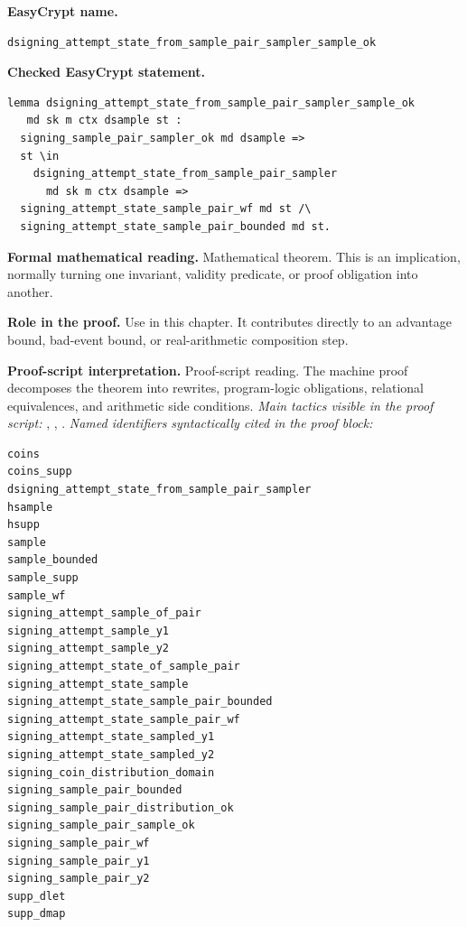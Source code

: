 \begin{formaltheorem}
\noindent\textbf{EasyCrypt name.}
\begin{lstlisting}[language=EasyCrypt,basicstyle=\ttfamily\scriptsize]
dsigning_attempt_state_from_sample_pair_sampler_sample_ok
\end{lstlisting}
\noindent\textbf{Checked EasyCrypt statement.}
\begin{lstlisting}[language=EasyCrypt,basicstyle=\ttfamily\scriptsize]
lemma dsigning_attempt_state_from_sample_pair_sampler_sample_ok
   md sk m ctx dsample st :
  signing_sample_pair_sampler_ok md dsample =>
  st \in
    dsigning_attempt_state_from_sample_pair_sampler
      md sk m ctx dsample =>
  signing_attempt_state_sample_pair_wf md st /\
  signing_attempt_state_sample_pair_bounded md st.
\end{lstlisting}
\noindent\textbf{Formal mathematical reading.}
Mathematical theorem. This is an implication, normally turning one invariant, validity predicate, or proof obligation into another.

\noindent\textbf{Role in the proof.}
Use in this chapter. It contributes directly to an advantage bound, bad-event bound, or real-arithmetic composition step.

\noindent\textbf{Proof-script interpretation.}
Proof-script reading. The machine proof decomposes the theorem into rewrites, program-logic obligations, relational equivalences, and arithmetic side conditions.
\emph{Main tactics visible in the proof script:} \ec{rewrite}, \ec{apply}, \ec{split}.
\emph{Named identifiers syntactically cited in the proof block:}
\begin{lstlisting}[language=EasyCrypt,basicstyle=\ttfamily\scriptsize]
coins
coins_supp
dsigning_attempt_state_from_sample_pair_sampler
hsample
hsupp
sample
sample_bounded
sample_supp
sample_wf
signing_attempt_sample_of_pair
signing_attempt_sample_y1
signing_attempt_sample_y2
signing_attempt_state_of_sample_pair
signing_attempt_state_sample
signing_attempt_state_sample_pair_bounded
signing_attempt_state_sample_pair_wf
signing_attempt_state_sampled_y1
signing_attempt_state_sampled_y2
signing_coin_distribution_domain
signing_sample_pair_bounded
signing_sample_pair_distribution_ok
signing_sample_pair_sample_ok
signing_sample_pair_wf
signing_sample_pair_y1
signing_sample_pair_y2
supp_dlet
supp_dmap
\end{lstlisting}

\end{formaltheorem}

